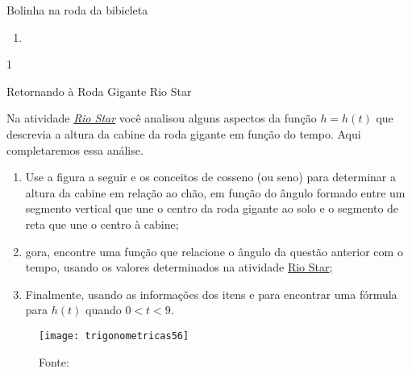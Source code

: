 \begin{answer}{Bolinha na roda da bibicleta}
{\begin{enumerate}[left=0pt, wide]
\item \phantom{a}


\end{enumerate}
}{1}
\end{answer}
\label{trig-exp4}

\begin{task}{Retornando à Roda Gigante Rio Star}
\label{trig-ativ15}

Na atividade \hyperref[trig-ativ4]{\textit{Rio Star}}  você analisou alguns aspectos da função $h = h(t)$ que descrevia a altura da cabine da roda gigante em função do tempo. Aqui completaremos essa análise.
\begin{enumerate}
\item Use a figura a seguir e os conceitos de cosseno (ou seno) para determinar a altura da cabine em relação ao chão, em função do ângulo formado entre um segmento vertical que une o centro da roda gigante ao solo e o segmento de reta que une o centro à cabine;
\item gora, encontre uma função que relacione o ângulo da questão anterior com o tempo, usando os valores determinados na atividade \hyperref[trig-ativ4]{Rio Star};
\item Finalmente, usando as informações dos itens  e  para encontrar uma fórmula para $h(t)$ quando $0 < t < 9$.
\end{enumerate}

\begin{figure}[H]
\centering

\texttt{[image: trigonometricas56]}
\caption{Fonte: \cite{soares2010}}
\label{}
\end{figure}
\end{task}

